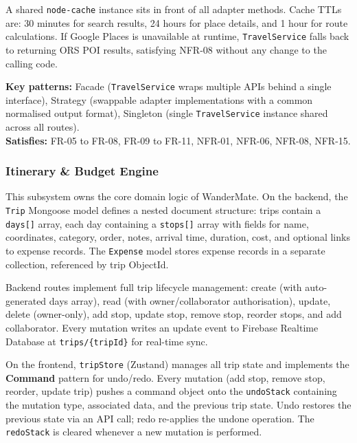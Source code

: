 \documentclass[12pt, a4paper]{article}
\begin{document}
A shared \texttt{node-cache} instance sits in front of all adapter methods. Cache TTLs are: 30 minutes for search results, 24 hours for place details, and 1 hour for route calculations. If Google Places is unavailable at runtime, \texttt{TravelService} falls back to returning ORS POI results, satisfying NFR-08 without any change to the calling code.

\begin{tcolorbox}[notebox]
  \textbf{Key patterns:} Facade (\texttt{TravelService} wraps multiple APIs behind a single interface), Strategy (swappable adapter implementations with a common normalised output format), Singleton (single \texttt{TravelService} instance shared across all routes).\\[2pt]
  \textbf{Satisfies:} FR-05 to FR-08, FR-09 to FR-11, NFR-01, NFR-06, NFR-08, NFR-15.
\end{tcolorbox}

\subsubsection{Itinerary \& Budget Engine}

This subsystem owns the core domain logic of WanderMate. On the backend, the \texttt{Trip} Mongoose model defines a nested document structure: trips contain a \texttt{days[]} array, each day containing a \texttt{stops[]} array with fields for name, coordinates, category, order, notes, arrival time, duration, cost, and optional links to expense records. The \texttt{Expense} model stores expense records in a separate collection, referenced by trip ObjectId.

Backend routes implement full trip lifecycle management: create (with auto-generated days array), read (with owner/collaborator authorisation), update, delete (owner-only), add stop, update stop, remove stop, reorder stops, and add collaborator. Every mutation writes an update event to Firebase Realtime Database at \texttt{trips/\{tripId\}} for real-time sync.

On the frontend, \texttt{tripStore} (Zustand) manages all trip state and implements the \textbf{Command} pattern for undo/redo. Every mutation (add stop, remove stop, reorder, update trip) pushes a command object onto the \texttt{undoStack} containing the mutation type, associated data, and the previous trip state. Undo restores the previous state via an API call; redo re-applies the undone operation. The \texttt{redoStack} is cleared whenever a new mutation is performed.
\end{document}
